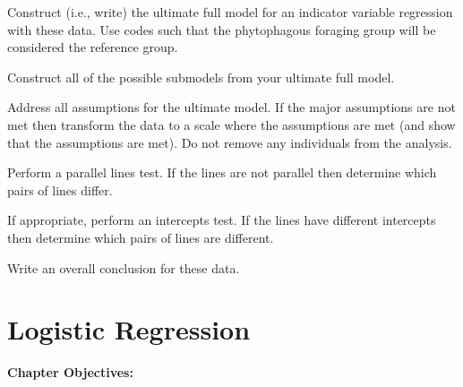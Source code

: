 \documentclass[10pt,openany]{book}\usepackage[]{graphicx}\usepackage[]{color}
\begin{document}
\begin{hwsection}
    \begin{Enumerate}
      \item Construct (i.e., write) the ultimate full model for an indicator variable regression with these data.  Use codes such that the phytophagous foraging group will be considered the reference group.
      \item Construct all of the possible submodels from your ultimate full model.
      \item Address all assumptions for the ultimate model.  If the major assumptions are not met then transform the data to a scale where the assumptions are met (and show that the assumptions are met).  Do not remove any individuals from the analysis.
      \item Perform a parallel lines test.  If the lines are not parallel then determine which pairs of lines differ.
      \item If appropriate, perform an intercepts test.  If the lines have different intercepts then determine which pairs of lines are different.
      \item Write an overall conclusion for these data.
    \end{Enumerate}

\end{hwsection}



\chapter{Logistic Regression}  \label{chap:LMLogistic}
  \vspace{0pt}
    \begin{ChapObj}{\boxwidth}
      \textbf{Chapter Objectives:}
        \begin{Enumerate}
          \item
        \end{Enumerate}
    \end{ChapObj}

\minitoc
\newpage
\end{document}
